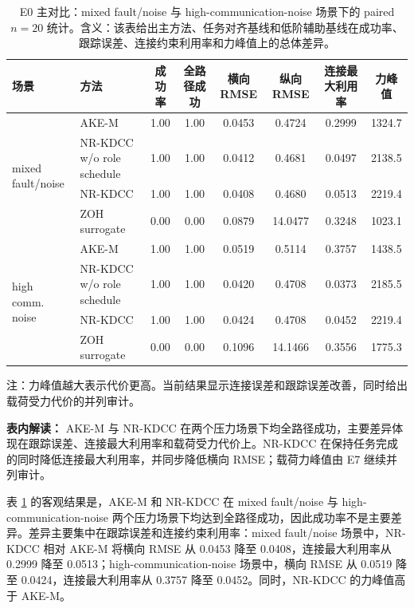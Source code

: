 \documentclass[twocolumn,3p,times,procedia]{elsarticle}
\newcommand{\AKE}{AKE-M}
\newcommand{\Method}{NR-KDCC}
\newcommand{\TF}{\Method{}}
\begin{document}
\begin{table}[!t]
\centering
\caption{E0 主对比：mixed fault/noise 与 high-communication-noise 场景下的 paired $n=20$ 统计。含义：该表给出主方法、任务对齐基线和低阶辅助基线在成功率、跟踪误差、连接约束利用率和力峰值上的总体差异。}
\label{tab:e0_main}
\footnotesize
\begin{tabular}{llcccccc}
\toprule
场景 & 方法 & 成功率 & 全路径成功 & 横向 RMSE & 纵向 RMSE & 连接最大利用率 & 力峰值 \\
\midrule
\multirow{4}{*}{mixed fault/noise}
& \AKE{} & 1.00 & 1.00 & 0.0453 & 0.4724 & 0.2999 & 1324.7\\
& \Method{} w/o role schedule & 1.00 & 1.00 & 0.0412 & 0.4681 & 0.0497 & 2138.5\\
& \TF{} & 1.00 & 1.00 & 0.0408 & 0.4680 & 0.0513 & 2219.4\\
& ZOH surrogate & 0.00 & 0.00 & 0.0879 & 14.0477 & 0.3248 & 1023.1\\
\midrule
\multirow{4}{*}{high comm. noise}
& \AKE{} & 1.00 & 1.00 & 0.0519 & 0.5114 & 0.3757 & 1438.5\\
& \Method{} w/o role schedule & 1.00 & 1.00 & 0.0420 & 0.4708 & 0.0373 & 2185.5\\
& \TF{} & 1.00 & 1.00 & 0.0424 & 0.4708 & 0.0452 & 2219.4\\
& ZOH surrogate & 0.00 & 0.00 & 0.1096 & 14.1466 & 0.3556 & 1775.3\\
\bottomrule
\end{tabular}
\begin{tablenotes}
\footnotesize
\item 注：力峰值越大表示代价更高。当前结果显示连接误差和跟踪误差改善，同时给出载荷受力代价的并列审计。
\end{tablenotes}
\vspace{1.5mm}
\begin{minipage}{0.93\textwidth}
\footnotesize
\textbf{表内解读：} \AKE{} 与 \Method{} 在两个压力场景下均全路径成功，主要差异体现在跟踪误差、连接最大利用率和载荷受力代价上。\Method{} 在保持任务完成的同时降低连接最大利用率，并同步降低横向 RMSE；载荷力峰值由 E7 继续并列审计。
\end{minipage}
\end{table}

表 \ref{tab:e0_main} 的客观结果是，\AKE{} 和 \Method{} 在 mixed fault/noise 与 high-communication-noise 两个压力场景下均达到全路径成功，因此成功率不是主要差异。差异主要集中在跟踪误差和连接约束利用率：mixed fault/noise 场景中，\Method{} 相对 \AKE{} 将横向 RMSE 从 0.0453 降至 0.0408，连接最大利用率从 0.2999 降至 0.0513；high-communication-noise 场景中，横向 RMSE 从 0.0519 降至 0.0424，连接最大利用率从 0.3757 降至 0.0452。同时，\Method{} 的力峰值高于 \AKE{}。
\end{document}
